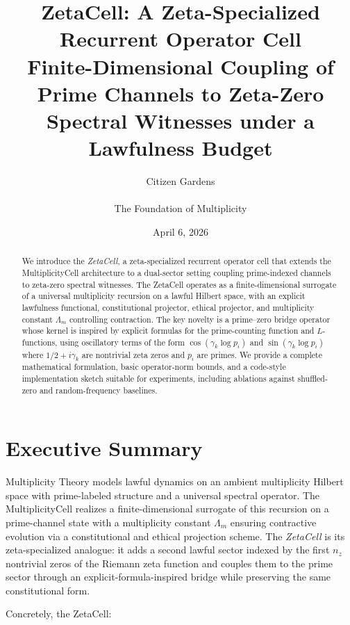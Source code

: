 \documentclass[11pt]{article}
\title{ZetaCell: A Zeta-Specialized Recurrent Operator Cell\\[0.25em]
\large Finite-Dimensional Coupling of Prime Channels to Zeta-Zero Spectral Witnesses under a Lawfulness Budget}
\author{Citizen Gardens \\ \\ The Foundation of Multiplicity}
\date{April 6, 2026}
\theoremstyle{definition}
\theoremstyle{plain}
\begin{document}
\maketitle

\begin{abstract}
We introduce the \emph{ZetaCell}, a zeta-specialized recurrent operator cell that extends the MultiplicityCell architecture to a dual-sector setting coupling prime-indexed channels to zeta-zero spectral witnesses.
The ZetaCell operates as a finite-dimensional surrogate of a universal multiplicity recursion on a lawful Hilbert space, with an explicit lawfulness functional, constitutional projector, ethical projector, and multiplicity constant $\Lambda_m$ controlling contraction.
The key novelty is a prime--zero bridge operator whose kernel is inspired by explicit formulas for the prime-counting function and $L$-functions, using oscillatory terms of the form $\cos(\gamma_k \log p_i)$ and $\sin(\gamma_k \log p_i)$ where $1/2 + i\gamma_k$ are nontrivial zeta zeros and $p_i$ are primes.
We provide a complete mathematical formulation, basic operator-norm bounds, and a code-style implementation sketch suitable for experiments, including ablations against shuffled-zero and random-frequency baselines.
\end{abstract}

\section*{Executive Summary}

Multiplicity Theory models lawful dynamics on an ambient multiplicity Hilbert space with prime-labeled structure and a universal spectral operator.
The MultiplicityCell realizes a finite-dimensional surrogate of this recursion on a prime-channel state with a multiplicity constant $\Lambda_m$ ensuring contractive evolution via a constitutional and ethical projection scheme.
The \emph{ZetaCell} is its zeta-specialized analogue: it adds a second lawful sector indexed by the first $n_z$ nontrivial zeros of the Riemann zeta function and couples them to the prime sector through an explicit-formula-inspired bridge while preserving the same constitutional form.

Concretely, the ZetaCell:
\end{document}
